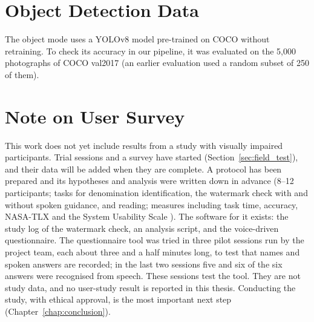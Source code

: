 \section{Object Detection Data}
The object mode uses a YOLOv8 model pre-trained on COCO without retraining. To check its accuracy in our pipeline, it was evaluated on the 5,000 photographs of COCO val2017 (an earlier evaluation used a random subset of 250 of them).

\section{Note on User Survey}
This work does not yet include results from a study with visually impaired participants. Trial sessions and a survey have started (Section~\ref{sec:field_test}), and their data will be added when they are complete. A protocol has been prepared and its hypotheses and analysis were written down in advance (8--12 participants; tasks for denomination identification, the watermark check with and without spoken guidance, and reading; measures including task time, accuracy, NASA-TLX \cite{nasatlx} and the System Usability Scale \cite{sus}). The software for it exists: the study log of the watermark check, an analysis script, and the voice-driven questionnaire. The questionnaire tool was tried in three pilot sessions run by the project team, each about three and a half minutes long, to test that names and spoken answers are recorded; in the last two sessions five and six of the six answers were recognised from speech. These sessions test the tool. They are not study data, and no user-study result is reported in this thesis. Conducting the study, with ethical approval, is the most important next step (Chapter~\ref{chap:conclusion}).
